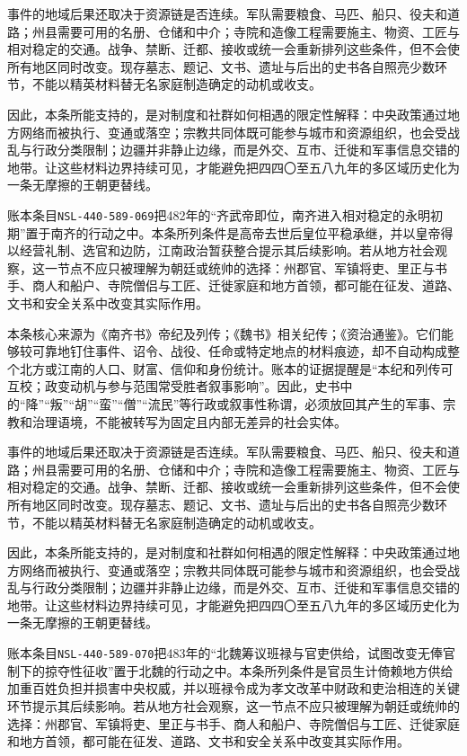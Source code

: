 事件的地域后果还取决于资源链是否连续。军队需要粮食、马匹、船只、役夫和道路；州县需要可用的名册、仓储和中介；寺院和造像工程需要施主、物资、工匠与相对稳定的交通。战争、禁断、迁都、接收或统一会重新排列这些条件，但不会使所有地区同时改变。现存墓志、题记、文书、遗址与后出的史书各自照亮少数环节，不能以精英材料替无名家庭制造确定的动机或收支。

因此，本条所能支持的，是对制度和社群如何相遇的限定性解释：中央政策通过地方网络而被执行、变通或落空；宗教共同体既可能参与城市和资源组织，也会受战乱与行政分类限制；边疆并非静止边缘，而是外交、互市、迁徙和军事信息交错的地带。让这些材料边界持续可见，才能避免把四四〇至五八九年的多区域历史化为一条无摩擦的王朝更替线。

账本条目\texttt{NSL-440-589-069}把482年的“齐武帝即位，南齐进入相对稳定的永明初期”置于南齐的行动之中。本条所列条件是高帝去世后皇位平稳承继，并以皇帝得以经营礼制、选官和边防，江南政治暂获整合提示其后续影响。若从地方社会观察，这一节点不应只被理解为朝廷或统帅的选择：州郡官、军镇将吏、里正与书手、商人和船户、寺院僧侣与工匠、迁徙家庭和地方首领，都可能在征发、道路、文书和安全关系中改变其实际作用。

本条核心来源为《南齐书》帝纪及列传；《魏书》相关纪传；《资治通鉴》。它们能够较可靠地钉住事件、诏令、战役、任命或特定地点的材料痕迹，却不自动构成整个北方或江南的人口、财富、信仰和身份统计。账本的证据提醒是“本纪和列传可互校；政变动机与参与范围常受胜者叙事影响”。因此，史书中的“降”“叛”“胡”“蛮”“僧”“流民”等行政或叙事性称谓，必须放回其产生的军事、宗教和治理语境，不能被转写为固定且内部无差异的社会实体。

事件的地域后果还取决于资源链是否连续。军队需要粮食、马匹、船只、役夫和道路；州县需要可用的名册、仓储和中介；寺院和造像工程需要施主、物资、工匠与相对稳定的交通。战争、禁断、迁都、接收或统一会重新排列这些条件，但不会使所有地区同时改变。现存墓志、题记、文书、遗址与后出的史书各自照亮少数环节，不能以精英材料替无名家庭制造确定的动机或收支。

因此，本条所能支持的，是对制度和社群如何相遇的限定性解释：中央政策通过地方网络而被执行、变通或落空；宗教共同体既可能参与城市和资源组织，也会受战乱与行政分类限制；边疆并非静止边缘，而是外交、互市、迁徙和军事信息交错的地带。让这些材料边界持续可见，才能避免把四四〇至五八九年的多区域历史化为一条无摩擦的王朝更替线。

账本条目\texttt{NSL-440-589-070}把483年的“北魏筹议班禄与官吏供给，试图改变无俸官制下的掠夺性征收”置于北魏的行动之中。本条所列条件是官员生计倚赖地方供给加重百姓负担并损害中央权威，并以班禄令成为孝文改革中财政和吏治相连的关键环节提示其后续影响。若从地方社会观察，这一节点不应只被理解为朝廷或统帅的选择：州郡官、军镇将吏、里正与书手、商人和船户、寺院僧侣与工匠、迁徙家庭和地方首领，都可能在征发、道路、文书和安全关系中改变其实际作用。

